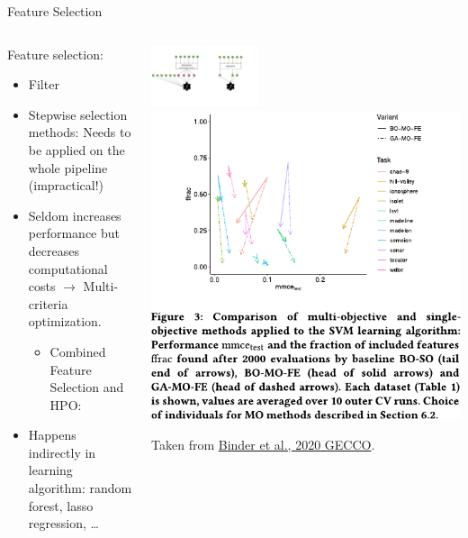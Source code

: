 \begin{frame}{Feature Selection}
    \begin{columns}
      \begin{column}{0.4\textwidth}
        Feature selection:
        \begin{itemize}
          \item Filter
          \item Stepwise selection methods: Needs to be applied on the whole pipeline (impractical!)
          \item Seldom increases performance but decreases computational costs $\rightarrow$ Multi-criteria optimization.
          \begin{itemize}
            \item Combined Feature Selection and HPO: 
          \end{itemize}
          \item Happens indirectly in learning algorithm: random forest, lasso regression, \ldots %
        \end{itemize}
      \end{column}%
      \begin{column}{0.6\textwidth}
        \begin{center}
          \includegraphics[width=0.35\textwidth, trim=450 100 110 60, clip]{images/feat_extr_vs_selection.pdf}%
          \includegraphics[width=0.55\linewidth]{images/Binder2020multiobjective_fig3.pdf}

          {\tiny \hfill Taken from \href{https://doi.org/10.1145/3377930.3389815}{Binder et al., 2020 GECCO}.}
        \end{center}
      \end{column}
    \end{columns}
    
\end{frame}

